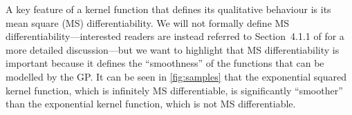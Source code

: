 \documentclass[letterpaper]{ar-1col}
\begin{document}
A key feature of a kernel function that defines its qualitative behaviour is its mean square (MS) differentiability.
We will not formally define MS differentiability---interested readers are instead referred to Section~4.1.1 of \citet{gpml} for a more detailed discussion---but we want to highlight that MS differentiability is important because it defines the ``smoothness'' of the functions that can be modelled by the GP.
It can be seen in \autoref{fig:samples} that the exponential squared kernel function, which is infinitely MS differentiable, is significantly ``smoother'' than the exponential kernel function, which is not MS differentiable.

\begin{armarginnote}[]
\end{armarginnote}
\end{document}
